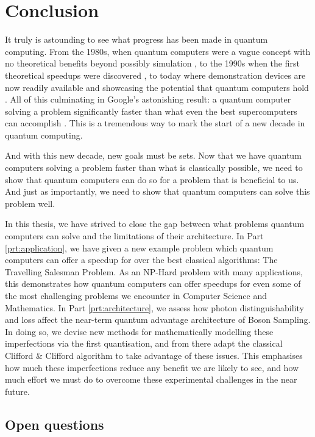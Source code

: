 \chapter{Conclusion}
\label{chp:conclusion}

It truly is astounding to see what progress has been made in quantum computing. From the 1980s, when quantum computers were a vague concept with no theoretical benefits beyond possibly simulation \cite{feynman1982}, to the 1990s when the first theoretical speedups were discovered \cite{shor1994, grover96}, to today where demonstration devices are now readily available and showcasing the potential that quantum computers hold \cite{rigetti, ibm}. All of this culminating in Google's astonishing result: a quantum computer solving a problem significantly faster than what even the best supercomputers can accomplish \cite{arute2019}. This is a tremendous way to mark the start of a new decade in quantum computing.

And with this new decade, new goals must be sets. Now that we have quantum computers solving a problem faster than what is classically possible, we need to show that quantum computers can do so for a problem that is beneficial to us. And just as importantly, we need to show that quantum computers can solve this problem well.

In this thesis, we have strived to close the gap between what problems quantum computers can solve and the limitations of their architecture. In Part \ref{prt:application}, we have given a new example problem which quantum computers can offer a speedup for over the best classical algorithms: The Travelling Salesman Problem. As an NP-Hard problem with many applications, this demonstrates how quantum computers can offer speedups for even some of the most challenging problems we encounter in Computer Science and Mathematics. In Part \ref{prt:architecture}, we assess how photon distinguishability and loss affect the near-term quantum advantage architecture of Boson Sampling. In doing so, we devise new methods for mathematically modelling these imperfections via the first quantisation, and from there adapt the classical Clifford \& Clifford algorithm \cite{clifford2017} to take advantage of these issues. This emphasises how much these imperfections reduce any benefit we are likely to see, and how much effort we must do to overcome these experimental challenges in the near future.

\section{Open questions}
\label{sec:oq}

